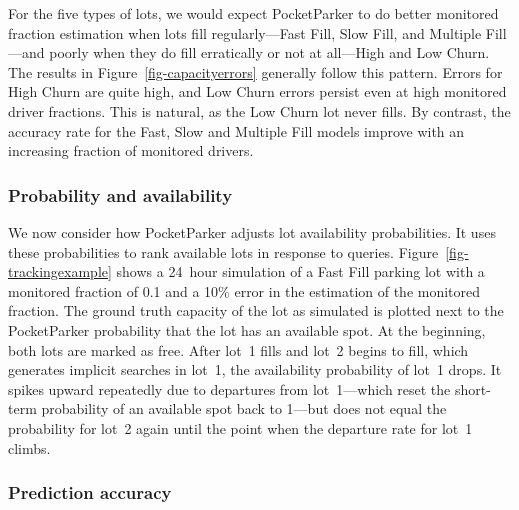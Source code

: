 \documentclass{sigchi}
\begin{document}
For the five types of lots, we would expect PocketParker to do better
monitored fraction estimation when lots fill regularly---Fast Fill, Slow
Fill, and Multiple Fill---and poorly when they do fill erratically or not at
all---High and Low Churn. The results in Figure~\ref{fig-capacityerrors}
generally follow this pattern. Errors for High Churn are quite high, and Low
Churn errors persist even at high monitored driver fractions. This is
natural, as the Low Churn lot never fills.  By contrast, the accuracy rate for
the Fast, Slow and Multiple Fill models improve with an increasing fraction of
monitored drivers.

\subsubsection{Probability and availability}

We now consider how PocketParker adjusts lot availability probabilities.  It
uses these probabilities to rank available lots in response to queries.
Figure~\ref{fig-trackingexample} shows a 24~hour simulation of a Fast Fill
parking lot with a monitored fraction of 0.1 and a 10\% error in the
estimation of the monitored fraction. The ground truth capacity of the lot as
simulated is plotted next to the PocketParker probability that the lot has an
available spot. At the beginning, both lots are marked as free. After lot~1
fills and lot~2 begins to fill, which generates implicit searches
in lot~1, the availability probability of lot~1 drops. It spikes upward
repeatedly due to departures from lot~1---which reset the short-term
probability of an available spot back to 1---but does not equal the
probability for lot~2 again until the point when the departure rate for lot~1
climbs.

\subsubsection{Prediction accuracy}
\end{document}
